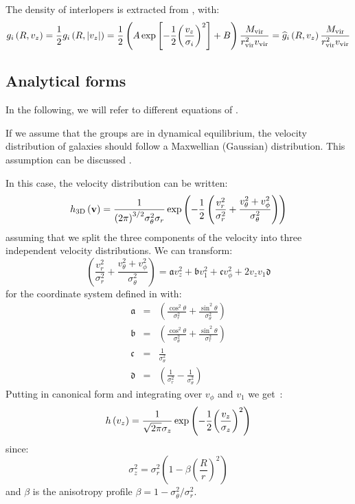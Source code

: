 The density of interlopers is extracted from \citet{MBM+10}, with:
%
\begin{equation}
    g_i\left(R,v_z\right)=\frac{1}{2} g_i\left(R,|v_z|\right)=
    \frac{1}{2}\left(A
        \exp\left[-\frac{1}{2}{\left(\frac{v_z}{\sigma_i}\right)}^2\right]
    +B\right)\frac{M_{\rm vir}}{r_{\rm vir}^2 v_{\rm vir}}=
    \widehat g_i\left(R,v_z\right)\frac{M_{\rm vir}}{r_{\rm vir}^2 v_{\rm vir}}
\end{equation}

\subsection{Analytical forms}
\label{sub:analytical_forms}

In the following, we will refer to different equations of
.

If we assume that the groups are in dynamical equilibrium, the velocity
distribution of galaxies should follow a Maxwellian (Gaussian) distribution.
This assumption can be discussed \citep{Beraldo+14}.

In this case, the velocity distribution can be written:
\begin{equation}
    h_\mathrm{3D}\left(\textbf{v}\right)=
    \frac{1}{{\left({2\pi}\right)}^{3/2}\sigma_{\theta}^2\sigma_r}
    \exp\left(-\frac{1}{2}\left(\frac{v_r^2}{\sigma_r^2}+
    \frac{v_{\theta}^2+v_{\phi}^2}{\sigma_{\theta}^2}\right)\right)
\end{equation}
%
assuming that we split the three components of the velocity into three
independent velocity distributions. We can transform:
%
\begin{equation}
    \label{eq:poly}
    \left(\frac{v_r^2}{\sigma_r^2}+\frac{v_{\theta}^2+
    v_{\phi}^2}{\sigma_{\theta}^2}\right) =
    \mathfrak{a} v_z^2 + \mathfrak{b} v_1^2 +
    \mathfrak{c} v_\phi^2 + 2 v_z v_1 \mathfrak{d}
\end{equation}
%
for the coordinate system defined in  with:
%
\begin{eqnarray}
    \mathfrak{a}&=&\left(\frac{\cos^2\theta}{\sigma_r^2}+
        \frac{\sin^2\theta}{\sigma_\theta^2}\right)\nonumber\\
    \mathfrak{b}&=&\left(\frac{\cos^2\theta}{\sigma_\theta^2}+
        \frac{\sin^2\theta}{\sigma_r^2}\right)\nonumber\\
    \mathfrak{c}&=&\frac{1}{\sigma_\theta^2}\nonumber\\
    \mathfrak{d}&=&\left(\frac{1}{\sigma_r^2}-\frac{1}{\sigma_\theta^2}\right)
\end{eqnarray}
%
Putting  in canonical form and integrating
 over $v_\phi$ and $v_1$ we get~\citep{Mamon+13}:
%
\begin{equation}
    \label{eq:velocity_distribution}
    h\left(v_z\right) = \frac{1}{\sqrt{2\pi}\sigma_z}
    \exp\left(-\frac{1}{2}{\left(\frac{v_z}{\sigma_z}\right)}^2\right)
\end{equation}
%
since:
%
\begin{equation}
    \sigma_z^2 =
    \sigma_r^2\left(1-\beta{\left(\frac{R}{r}\right)}^2\right)
\end{equation}
%
and $\beta$ is the anisotropy profile $\beta=1-\sigma_\theta^2/\sigma_r^2$.


